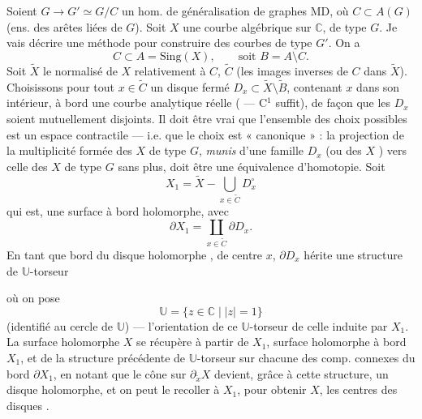 \documentclass[11pt,a4paper]{article}
\begin{document}



Soient $G \to G' \simeq G/C$ un hom. de généralisation de graphes MD, où
$C \subset A(G)$ (ens. des arêtes liées de $G$). Soit $X$ une courbe
algébrique sur $\mathbb{C}$, de type $G$. Je vais décrire une méthode pour
construire des courbes  de type $G'$. On a
\[
C \subset A = \mathrm{Sing}(X), \qquad \text{soit } B = A \setminus C .
\]
Soit  $\widetilde{X}$  le
normalisé de $X$ relativement à $C$, $\widetilde{C}$ (les images inverses
 de $C$ dans $\widetilde{X}$). Choisissons pour tout
$x \in \widetilde{C}$ un disque fermé
$D_x \subset \widetilde{X} \setminus \widetilde{B}$, contenant $x$ dans son
intérieur, à bord  une courbe analytique réelle
( — C$^1$ \struck{\ill{}} suffit), de façon que
les $D_x$ soient mutuellement disjoints. Il doit être vrai que l'ensemble des
choix possibles est  un espace contractile — i.e. que le choix est
« canonique » : la projection de la multiplicité  formée des $X$ de
type $G$, \textit{munis} d'une famille $D_x$ (ou \ill{} des $X$
) vers celle des $X$ de type $G$ sans plus, doit être une
équivalence d'homotopie. Soit
\[
X_1 = \widetilde{X} - \bigcup_{x \in \widetilde{C}} D_x^{\circ}
\]
qui est,  une
surface à bord holomorphe, avec
\[
\partial X_1 = \coprod_{x \in \widetilde{C}} \partial D_x .
\]
En tant que bord du disque holomorphe , de centre $x$,
$\partial D_x$ hérite une structure de $\mathbb{U}$-torseur

où on pose
\[
\mathbb{U} = \{ z \in \mathbb{C} \mid |z| = 1 \}
\]
(identifié au cercle de $\mathbb{U}$) — l'orientation de ce $\mathbb{U}$-torseur
 de celle induite par $X_1$. \struck{\ill{}} La surface
holomorphe $X$ \struck{\ill{}}  se récupère à partir de
$X_1$, surface holomorphe à bord $X_1$, et de la structure précédente
 de $\mathbb{U}$-torseur sur
chacune des comp. connexes du bord $\partial X_1$, en notant que le cône sur
$\partial_{\tilde{x}} X$  devient, grâce à cette structure, un
disque holomorphe, et  on peut le recoller
à $X_1$, pour obtenir $X$, \ill{} les centres des disques
.
\end{document}
